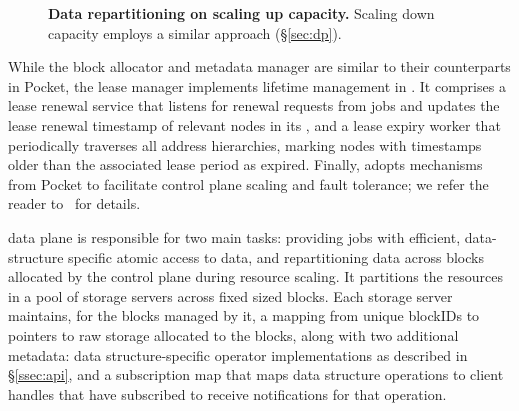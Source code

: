 \begin{figure}
  \vspace{-1.75em}
  \caption{\small\textbf{Data repartitioning on scaling up capacity.} Scaling down capacity employs a similar approach (\S\ref{sec:dp}).}\label{fig:autoscaling}\vspace{-1em}
\end{figure}
%
While the block allocator and metadata manager are similar to their counterparts in Pocket, the lease manager implements lifetime management in \jiffy. It comprises a lease renewal service that listens for renewal requests from jobs and updates the lease renewal timestamp of relevant nodes in its \lh, and a lease expiry worker that periodically traverses all address hierarchies, marking nodes with timestamps older than the associated lease period as expired. Finally, \jiffy adopts mechanisms from Pocket to facilitate control plane scaling and fault tolerance; we refer the reader to~\cite{pocket} for details.

 \jiffy data plane is responsible for two main tasks: providing jobs with efficient, data-structure specific atomic access to data, and repartitioning data across blocks allocated by the control plane during resource scaling. It partitions the resources in a pool of storage servers across fixed sized blocks. Each storage server maintains, for the blocks managed by it, a mapping from unique blockIDs to pointers to raw storage allocated to the blocks, along with two additional metadata: data structure-specific operator implementations as described in \S\ref{ssec:api}, and a subscription map that maps data structure operations to client handles that have subscribed to receive notifications for that operation. %

